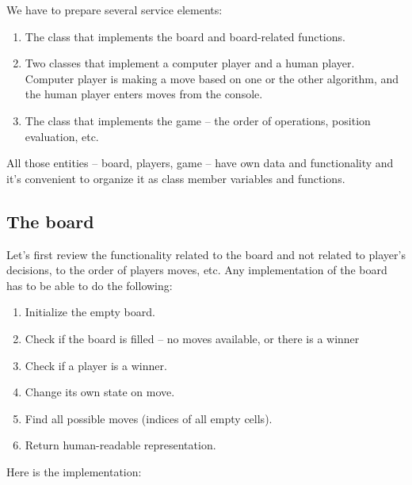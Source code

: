 We have to prepare several service elements:

\begin{enumerate}
\item The class that implements the board and board-related functions.
\item Two classes that implement a computer player and a human player.
Computer player is making a move based on one or the other algorithm, and
the human player enters moves from the console.
\item The class that implements the game -- the order of operations,
position evaluation, etc.
\end{enumerate}

All those entities -- board, players, game -- have own data and functionality
and it's convenient to organize it as class member variables and functions.

\subsection{The board}

Let's first review the functionality related to the board and
not related to player's decisions, to the order of players moves, etc.
Any implementation of the board has to be able to do the following:

\begin{enumerate}
\item Initialize the empty board.
\item Check if the board is filled -- no moves available, or there is a winner
\item Check if a player is a winner.
\item Change its own state on move.
\item Find all possible moves (indices of all empty cells).
\item Return human-readable representation.
\end{enumerate}

Here is the implementation:

